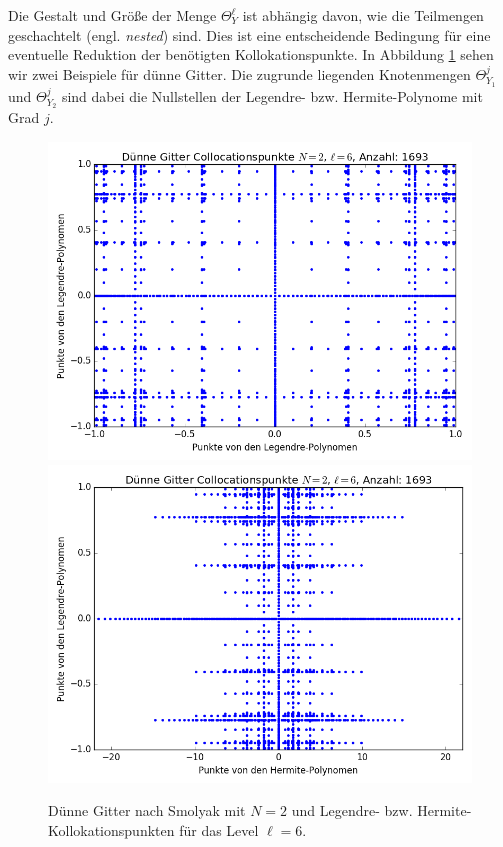 Die Gestalt und Größe der Menge $\Theta_Y^\ell$ ist abhängig davon, wie die Teilmengen geschachtelt (engl. \emph{nested}) sind. Dies ist eine entscheidende Bedingung für eine eventuelle Reduktion der benötigten Kollokationspunkte. In Abbildung \ref{fig:grids} sehen wir zwei Beispiele für dünne Gitter. Die zugrunde liegenden Knotenmengen $\Theta_{Y_1}^j$ und $\Theta_{Y_2}^j$ sind dabei die Nullstellen der Legendre- bzw. Hermite-Polynome mit Grad $j$.
\begin{figure}[!htb]
  \includegraphics[width=\linewidth]{Figures/sparse_grid_legendre_legendre.png}
\endminipage
{}
  \includegraphics[width=\linewidth]{Figures/sparse_grid_hermite_legendre.png}
\endminipage
\caption{Dünne Gitter nach Smolyak mit $N=2$ und Legendre- bzw. Hermite-Kollokationspunkten für das Level $\ell=6$.}
\label{fig:grids}
\end{figure}
